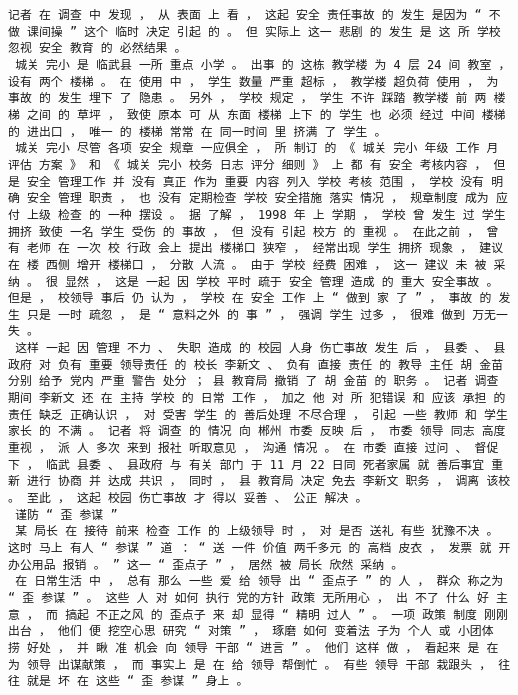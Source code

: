 \documentclass{article}
\begin{document}
\begin{Verbatim}[commandchars=\\\{\}]
 记者 在 调查 中 发现 ， 从 表面 上 看 ， 这起 安全 责任事故 的 发生 是因为 “ 不 做 课间操 ” 这个 临时 决定 引起 的 。 但 实际上 这一 悲剧 的 发生 是 这 所 学校 忽视 安全 教育 的 必然结果 。 
 城关 完小 是 临武县 一所 重点 小学 。 出事 的 这栋 教学楼 为 4 层 24 间 教室 ， 设有 两个 楼梯 。 在 使用 中 ， 学生 数量 严重 超标 ， 教学楼 超负荷 使用 ， 为 事故 的 发生 埋下 了 隐患 。 另外 ， 学校 规定 ， 学生 不许 踩踏 教学楼 前 两 楼梯 之间 的 草坪 ， 致使 原本 可 从 东面 楼梯 上下 的 学生 也 必须 经过 中间 楼梯 的 进出口 ， 唯一 的 楼梯 常常 在 同一时间 里 挤满 了 学生 。 
 城关 完小 尽管 各项 安全 规章 一应俱全 ， 所 制订 的 《 城关 完小 年级 工作 月 评估 方案 》 和 《 城关 完小 校务 日志 评分 细则 》 上 都 有 安全 考核内容 ， 但是 安全 管理工作 并 没有 真正 作为 重要 内容 列入 学校 考核 范围 ， 学校 没有 明确 安全 管理 职责 ， 也 没有 定期检查 学校 安全措施 落实 情况 ， 规章制度 成为 应付 上级 检查 的 一种 摆设 。 据 了解 ， 1998 年 上 学期 ， 学校 曾 发生 过 学生 拥挤 致使 一名 学生 受伤 的 事故 ， 但 没有 引起 校方 的 重视 。 在此之前 ， 曾 有 老师 在 一次 校 行政 会上 提出 楼梯口 狭窄 ， 经常出现 学生 拥挤 现象 ， 建议 在 楼 西侧 增开 楼梯口 ， 分散 人流 。 由于 学校 经费 困难 ， 这一 建议 未 被 采纳 。 很 显然 ， 这是 一起 因 学校 平时 疏于 安全 管理 造成 的 重大 安全事故 。 但是 ， 校领导 事后 仍 认为 ， 学校 在 安全 工作 上 “ 做到 家 了 ” ， 事故 的 发生 只是 一时 疏忽 ， 是 “ 意料之外 的 事 ” ， 强调 学生 过多 ， 很难 做到 万无一失 。 
 这样 一起 因 管理 不力 、 失职 造成 的 校园 人身 伤亡事故 发生 后 ， 县委 、 县政府 对 负有 重要 领导责任 的 校长 李新文 、 负有 直接 责任 的 教导 主任 胡 金苗 分别 给予 党内 严重 警告 处分 ； 县 教育局 撤销 了 胡 金苗 的 职务 。 记者 调查 期间 李新文 还 在 主持 学校 的 日常 工作 ， 加之 他 对 所 犯错误 和 应该 承担 的 责任 缺乏 正确认识 ， 对 受害 学生 的 善后处理 不尽合理 ， 引起 一些 教师 和 学生家长 的 不满 。 记者 将 调查 的 情况 向 郴州 市委 反映 后 ， 市委 领导 同志 高度重视 ， 派 人 多次 来到 报社 听取意见 ， 沟通 情况 。 在 市委 直接 过问 、 督促 下 ， 临武 县委 、 县政府 与 有关 部门 于 11 月 22 日同 死者家属 就 善后事宜 重新 进行 协商 并 达成 共识 ， 同时 ， 县 教育局 决定 免去 李新文 职务 ， 调离 该校 。 至此 ， 这起 校园 伤亡事故 才 得以 妥善 、 公正 解决 。 
 谨防 “ 歪 参谋 ” 
 某 局长 在 接待 前来 检查 工作 的 上级领导 时 ， 对 是否 送礼 有些 犹豫不决 。 这时 马上 有人 “ 参谋 ” 道 ： “ 送 一件 价值 两千多元 的 高档 皮衣 ， 发票 就 开 办公用品 报销 。 ” 这一 “ 歪点子 ” ， 居然 被 局长 欣然 采纳 。 
 在 日常生活 中 ， 总有 那么 一些 爱 给 领导 出 “ 歪点子 ” 的 人 ， 群众 称之为 “ 歪 参谋 ” 。 这些 人 对 如何 执行 党的方针 政策 无所用心 ， 出 不了 什么 好 主意 ， 而 搞起 不正之风 的 歪点子 来 却 显得 “ 精明 过人 ” 。 一项 政策 制度 刚刚 出台 ， 他们 便 挖空心思 研究 “ 对策 ” ， 琢磨 如何 变着法 子为 个人 或 小团体 捞 好处 ， 并 瞅 准 机会 向 领导 干部 “ 进言 ” 。 他们 这样 做 ， 看起来 是 在 为 领导 出谋献策 ， 而 事实上 是 在 给 领导 帮倒忙 。 有些 领导 干部 栽跟头 ， 往往 就是 坏 在 这些 “ 歪 参谋 ” 身上 。 

\end{Verbatim}
\end{document}
